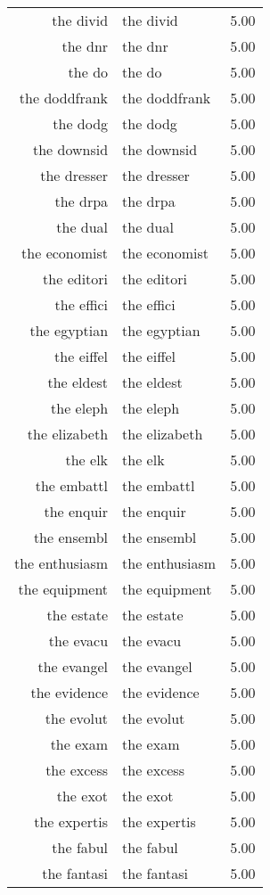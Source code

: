 \begin{table}[ht]
\begin{tabular}{rlr}
  the divid & the divid & 5.00 \\ 
  the dnr & the dnr & 5.00 \\ 
  the do & the do & 5.00 \\ 
  the doddfrank & the doddfrank & 5.00 \\ 
  the dodg & the dodg & 5.00 \\ 
  the downsid & the downsid & 5.00 \\ 
  the dresser & the dresser & 5.00 \\ 
  the drpa & the drpa & 5.00 \\ 
  the dual & the dual & 5.00 \\ 
  the economist & the economist & 5.00 \\ 
  the editori & the editori & 5.00 \\ 
  the effici & the effici & 5.00 \\ 
  the egyptian & the egyptian & 5.00 \\ 
  the eiffel & the eiffel & 5.00 \\ 
  the eldest & the eldest & 5.00 \\ 
  the eleph & the eleph & 5.00 \\ 
  the elizabeth & the elizabeth & 5.00 \\ 
  the elk & the elk & 5.00 \\ 
  the embattl & the embattl & 5.00 \\ 
  the enquir & the enquir & 5.00 \\ 
  the ensembl & the ensembl & 5.00 \\ 
  the enthusiasm & the enthusiasm & 5.00 \\ 
  the equipment & the equipment & 5.00 \\ 
  the estate & the estate & 5.00 \\ 
  the evacu & the evacu & 5.00 \\ 
  the evangel & the evangel & 5.00 \\ 
  the evidence & the evidence & 5.00 \\ 
  the evolut & the evolut & 5.00 \\ 
  the exam & the exam & 5.00 \\ 
  the excess & the excess & 5.00 \\ 
  the exot & the exot & 5.00 \\ 
  the expertis & the expertis & 5.00 \\ 
  the fabul & the fabul & 5.00 \\ 
  the fantasi & the fantasi & 5.00 \\ 

\end{tabular}
\end{table}
